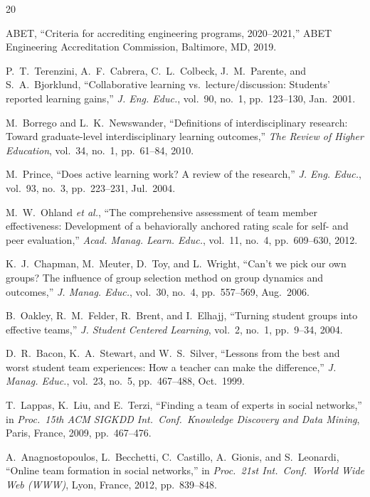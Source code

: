 \documentclass[12pt,a4paper]{article}
\begin{document}
\begin{thebibliography}{20}

ABET, ``Criteria for accrediting engineering programs, 2020--2021,'' ABET Engineering Accreditation Commission, Baltimore, MD, 2019.

P.~T.~Terenzini, A.~F.~Cabrera, C.~L.~Colbeck, J.~M.~Parente, and S.~A.~Bjorklund, ``Collaborative learning vs.\ lecture/discussion: Students' reported learning gains,'' \textit{J. Eng. Educ.}, vol.~90, no.~1, pp.~123--130, Jan.\ 2001.

M.~Borrego and L.~K.~Newswander, ``Definitions of interdisciplinary research: Toward graduate-level interdisciplinary learning outcomes,'' \textit{The Review of Higher Education}, vol.~34, no.~1, pp.~61--84, 2010.

M.~Prince, ``Does active learning work? A review of the research,'' \textit{J. Eng. Educ.}, vol.~93, no.~3, pp.~223--231, Jul.\ 2004.

M.~W.~Ohland \textit{et al.}, ``The comprehensive assessment of team member effectiveness: Development of a behaviorally anchored rating scale for self- and peer evaluation,'' \textit{Acad. Manag. Learn. Educ.}, vol.~11, no.~4, pp.~609--630, 2012.

K.~J.~Chapman, M.~Meuter, D.~Toy, and L.~Wright, ``Can't we pick our own groups? The influence of group selection method on group dynamics and outcomes,'' \textit{J. Manag. Educ.}, vol.~30, no.~4, pp.~557--569, Aug.\ 2006.

B.~Oakley, R.~M.~Felder, R.~Brent, and I.~Elhajj, ``Turning student groups into effective teams,'' \textit{J. Student Centered Learning}, vol.~2, no.~1, pp.~9--34, 2004.

D.~R.~Bacon, K.~A.~Stewart, and W.~S.~Silver, ``Lessons from the best and worst student team experiences: How a teacher can make the difference,'' \textit{J. Manag. Educ.}, vol.~23, no.~5, pp.~467--488, Oct.\ 1999.

T.~Lappas, K.~Liu, and E.~Terzi, ``Finding a team of experts in social networks,'' in \textit{Proc.\ 15th ACM SIGKDD Int.\ Conf.\ Knowledge Discovery and Data Mining}, Paris, France, 2009, pp.~467--476.

A.~Anagnostopoulos, L.~Becchetti, C.~Castillo, A.~Gionis, and S.~Leonardi, ``Online team formation in social networks,'' in \textit{Proc.\ 21st Int.\ Conf.\ World Wide Web (WWW)}, Lyon, France, 2012, pp.~839--848.


\end{thebibliography}
\end{document}
